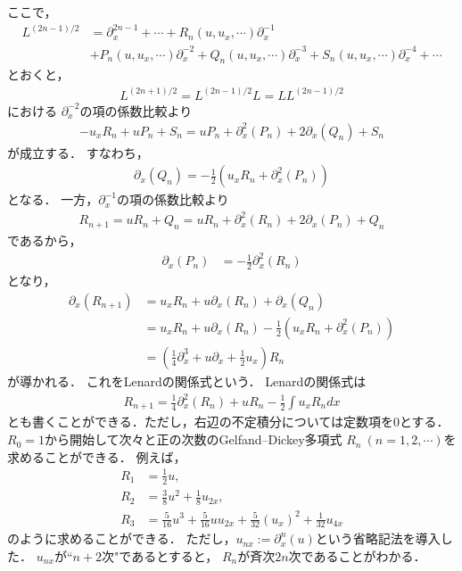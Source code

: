 \documentclass[dvipdfmx,12pt,a4paper,uplatex]{jsarticle}
\theoremstyle{plain}
\theoremstyle{definition}
\begin{document}
ここで，
\begin{align}
L^{(2n-1)/2}  
&=
\partial_x^{2n-1}+\cdots
+R_n(u,u_x,\cdots)\partial_x^{-1} \nonumber \\
&+
P_n(u,u_x,\cdots)\partial_x^{-2} 
+Q_n(u,u_x,\cdots)\partial_x^{-3} 
+S_n(u,u_x,\cdots)\partial_x^{-4} 
+ \cdots
\end{align}
とおくと，
\begin{align}
L^{(2n+1)/2} = L^{(2n-1)/2} L = L L^{(2n-1)/2}  
\end{align}
における
$\partial_x^{-2}$の項の係数比較より
\begin{align}
-u_x R_n + uP_n + S_n
= uP_n + \partial_x^2(P_n) + 2\partial_x(Q_n) + S_n
\end{align}
が成立する．
すなわち，
\begin{align}
\partial_x(Q_n) = 
-\frac12 \left(u_x R_n + \partial_x^2(P_n) \right)
\end{align}
となる．
一方，$\partial_x^{-1}$の項の係数比較より
\begin{align}
R_{n+1} =
u R_n  + Q_n 
= uR_n + \partial_x^2(R_n) + 2\partial_x(P_n) + Q_n
\end{align}
であるから，
\begin{align}
\partial_x(P_n) &= -\frac12 \partial_x^2(R_n) 
\end{align}
となり，
\begin{align}
\partial_x(R_{n+1}) 
&= u_x R_n + u\partial_x(R_n) + \partial_x(Q_n) \nonumber\\
&=
u_x R_n + u\partial_x(R_n)
-\frac12 \left(u_x R_n + \partial_x^2(P_n) \right) \nonumber \\
&=
\left(\frac14 \partial_x^3 + u\partial_x + \frac12 u_x \right)R_n
\end{align}
が導かれる．
これをLenardの関係式という．
Lenardの関係式は
\begin{align}
R_{n+1}
=
\frac14 \partial_x^2(R_n) + uR_n 
- \frac12 \int  u_x R_n dx
\end{align}
とも書くことができる．ただし，右辺の不定積分については定数項を0とする．
$R_0=1$から開始して次々と正の次数のGelfand--Dickey多項式
$R_n\ (n=1,2,\cdots)$を求めることができる．
例えば，
\begin{align}
R_1 &= \frac12 u,\\
R_2 &= \frac{3}{8}u^2 + \frac{1}{8}u_{2x}  ,\\
R_3 &= \frac{5}{16}u^3 +\frac{5}{16}uu_{2x}
+\frac{5}{32}(u_{x})^2 +\frac{1}{32} u_{4x}
\end{align}
のように求めることができる．
ただし，$u_{nx}:=\partial^n_x(u)$という省略記法を導入した．
$u_{nx}$が``$n+2$次"であるとすると，
$R_n$が斉次$2n$次であることがわかる．
\end{document}

